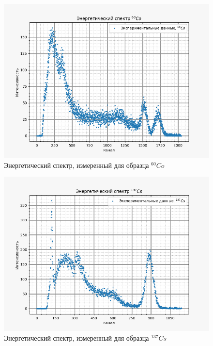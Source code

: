    \begin{figure}[H]
        \centering
        \includegraphics[width = 12 cm]{images/Co60}
        \caption{Энергетический спектр, измеренный для образца $^{60}Co$}
        \label{Co60_pic}
    \end{figure}

    \begin{figure}[H]
        \centering
        \includegraphics[width = 12 cm]{images/Cs137}
        \caption{Энергетический спектр, измеренный для образца $^{137}Cs$}
        \label{Cs137_pic}
    \end{figure}

